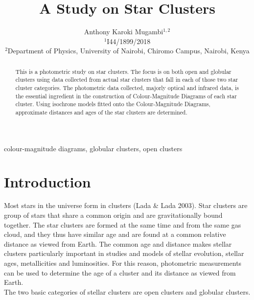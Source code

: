 \documentclass[12pt]{article}
\title{A Study on Star Clusters}
\author{Anthony Karoki Mugambi$^{1, 2}$\\
	\small $^1$I44/1899/2018\\
	\small $^2$Department of Physics, University of Nairobi, Chiromo Campus, Nairobi, Kenya
}
\date{}
\providecommand{\keywords}[1]
{
	\small	
	\textbf{\text{Keywords: }} #1
}
\begin{document}
	\maketitle
	
	\begin{abstract}
		This is a photometric study on star clusters. The focus is on both open and globular clusters using data collected from actual star clusters that fall in each of those two star cluster categories. The photometric data collected, majorly optical and infrared data, is the essential ingredient in the construction of Colour-Magnitude Diagrams of each star cluster. Using isochrone models fitted onto the Colour-Magnitude Diagrams, approximate distances and ages of the star clusters are determined.
	\end{abstract}

	\keywords{colour-magnitude diagrams, globular clusters, open clusters}
	
	\pagebreak
	\tableofcontents
	
	\pagebreak
	\listoffigures

	\pagebreak
	\section{Introduction}
	\label{sec:intro}
	Most stars in the universe form in clusters (Lada \& Lada 2003). Star clusters are group of stars that share a common origin and are gravitationally bound together. The star clusters are formed at the same time and from the same gas cloud, and they thus have similar age and are found at a common relative distance as viewed from Earth. The common age and distance makes stellar clusters particularly important in studies and models of stellar evolution, stellar ages, metallicities and luminosities. For this reason, photometric measurements can be used to determine the age of a cluster and its distance as viewed from Earth.\\
	The two basic categories of stellar clusters are open clusters and globular clusters.\\
\end{document}
